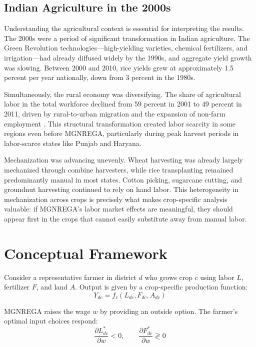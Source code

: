 \documentclass[12pt]{article}
\begin{document}
\subsection{Indian Agriculture in the 2000s}

Understanding the agricultural context is essential for interpreting the results. The 2000s were a period of significant transformation in Indian agriculture. The Green Revolution technologies---high-yielding varieties, chemical fertilizers, and irrigation---had already diffused widely by the 1990s, and aggregate yield growth was slowing. Between 2000 and 2010, rice yields grew at approximately 1.5 percent per year nationally, down from 3 percent in the 1980s.

Simultaneously, the rural economy was diversifying. The share of agricultural labor in the total workforce declined from 59 percent in 2001 to 49 percent in 2011, driven by rural-to-urban migration and the expansion of non-farm employment \citep{basu2013global}. This structural transformation created labor scarcity in some regions even before MGNREGA, particularly during peak harvest periods in labor-scarce states like Punjab and Haryana.

Mechanization was advancing unevenly. Wheat harvesting was already largely mechanized through combine harvesters, while rice transplanting remained predominantly manual in most states. Cotton picking, sugarcane cutting, and groundnut harvesting continued to rely on hand labor. This heterogeneity in mechanization across crops is precisely what makes crop-specific analysis valuable: if MGNREGA's labor market effects are meaningful, they should appear first in the crops that cannot easily substitute away from manual labor.

\section{Conceptual Framework}

Consider a representative farmer in district $d$ who grows crop $c$ using labor $L$, fertilizer $F$, and land $A$. Output is given by a crop-specific production function:
\begin{equation}
    Y_{dc} = f_c(L_{dc}, F_{dc}, A_{dc})
\end{equation}

MGNREGA raises the wage $w$ by providing an outside option. The farmer's optimal input choices respond:
\begin{equation}
    \frac{\partial L^*_{dc}}{\partial w} < 0, \qquad \frac{\partial F^*_{dc}}{\partial w} \gtrless 0
\end{equation}
\end{document}
